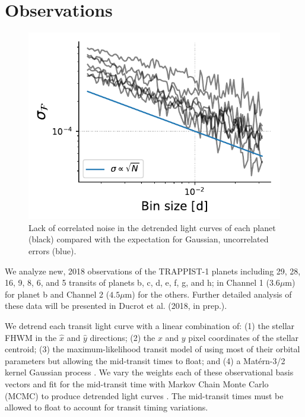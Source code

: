 \section{Observations}

\begin{figure}
    \centering
    \includegraphics[scale=0.8]{trappist1_robin/correlated_noise.pdf}
    \caption{Lack of correlated noise in the detrended light curves of each planet (black) compared with the expectation for Gaussian, uncorrelated errors (blue).}
    \label{fig:correlatednoise}
\end{figure}

We analyze new, 2018 \spitzer observations of the TRAPPIST-1 planets including 29, 28, 16, 9, 8, 6, and 5 transits of planets b, c, d, e, f, g, and h; in \spitzer Channel 1 ($3.6 \mu$m) for planet b and Channel 2 ($4.5 \mu$m) for the others. Further detailed analysis of these data will be presented in Ducrot et al. (2018, in prep.).

We detrend each transit light curve with a linear combination of: (1) the stellar FHWM in the $\hat{x}$ and $\hat{y}$ directions; (2) the $x$ and $y$ pixel coordinates of the stellar centroid; (3) the maximum-likelihood transit model of \citet{Delrez2018} using most of their orbital parameters but allowing the mid-transit times to float; and (4) a Mat{\' e}rn-3/2 kernel Gaussian process \citep{Foreman-Mackey2017}. We vary the weights each of these observational basis vectors and fit for the mid-transit time with Markov Chain Monte Carlo (MCMC) to produce detrended light curves \citep{Foreman-Mackey2013}. The mid-transit times must be allowed to float to account for transit timing variations.

